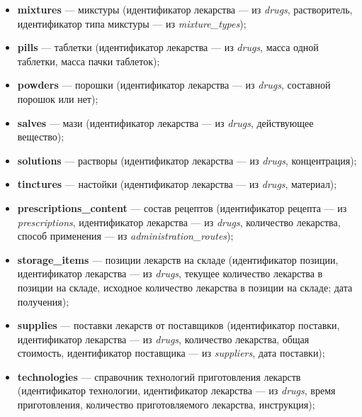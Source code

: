 \documentclass[a4paper]{article}
\newcommand{\dbtable}[1]{\textbf{#1}}
\newcommand{\dbtableref}[1]{\textit{#1}}
\begin{document}
\begin{itemize}
				\item \dbtable{mixtures} --- микстуры (идентификатор лекарства --- из \dbtableref{drugs}, растворитель, идентификатор типа микстуры --- из \dbtableref{mixture\_types});
					
				\item \dbtable{pills} --- таблетки (идентификатор лекарства --- из \dbtableref{drugs}, масса одной таблетки, масса пачки таблеток);
					
				\item \dbtable{powders} --- порошки (идентификатор лекарства --- из \dbtableref{drugs}, составной порошок или нет);
					
				\item \dbtable{salves} --- мази (идентификатор лекарства --- из \dbtableref{drugs}, действующее вещество);
					
				\item \dbtable{solutions} --- растворы (идентификатор лекарства --- из \dbtableref{drugs}, концентрация);
					
				\item \dbtable{tinctures} --- настойки (идентификатор лекарства --- из \dbtableref{drugs}, материал);
					
				\item \dbtable{prescriptions\_content} --- состав рецептов (идентификатор рецепта --- из \dbtableref{prescriptions}, идентификатор лекарства --- из \dbtableref{drugs}, количество лекарства, способ применения --- из \dbtableref{administration\_routes});
					
				\item \dbtable{storage\_items} --- позиции лекарств на складе (идентификатор позиции, идентификатор лекарства --- из \dbtableref{drugs}, текущее количество лекарства в позиции на складе, исходное количество лекарства в позиции на складе; дата получения);
					
				\item \dbtable{supplies} --- поставки лекарств от поставщиков (идентификатор поставки, идентификатор лекарства --- из \dbtableref{drugs}, количество лекарства, общая стоимость, идентификатор поставщика --- из \dbtableref{suppliers}, дата поставки);
					
				\item \dbtable{technologies} --- справочник технологий приготовления лекарств (идентификатор технологии, идентификатор лекарства --- из \dbtableref{drugs}, время приготовления, количество приготовляемого лекарства, инструкция);
					

\end{itemize}
\end{document}
